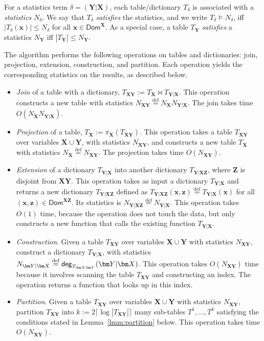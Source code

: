\documentclass[10pt,a4paper]{article}
\newcommand{\dom}{\textsf{Dom}}
\newcommand{\degree}{\text{\sf deg}}
\newcommand{\defeq}{\stackrel{\text{def}}{=}}
\begin{document}
For a statistics term $\delta = (\bm Y | \bm X)$, each table/dictionary $T_\delta$ is
associated with a {\em statistics} $N_\delta$. We say that $T_\delta$ {\em satisfies} the
statistics, and we write $T_\delta \models N_\delta$, iff $|T_\delta(\bm x)| \leq N_\delta$
for all $\bm x \in \dom^{\bm X}$. As a special case, a table $T_{\bm Y}$ {\em satisfies} a
statistics $N_{\bm Y}$ iff $|T_{\bm Y}| \leq N_{\bm Y}$.

The algorithm performs the following operations on tables and dictionaries:
join, projection, extension, construction, and partition.
Each operation yields the corresponding statistics on the results, as described below.

\begin{itemize}
\item {\em Join} of a table with a dictionary,
  $T_{\bm X\bm Y} := T_{\bm X} \Join T_{\bm Y|\bm X}$.  This operation
  constructs a new table with statistics
  $N_{\bm X\bm Y} \defeq N_{\bm X} N_{\bm Y|\bm X}$.  The join takes time $O(N_{\bm X} N_{\bm Y|\bm X})$.
\item {\em Projection} of a table, $T_{\bm X} := \pi_{\bm X}(T_{\bm X\bm Y})$.
This operation takes a table $T_{\bm X \bm Y}$ over variables $\bm X \cup \bm Y$,
with statistics $N_{\bm X\bm Y}$, and constructs a new table $T_{\bm X}$ with
  statistics $N_{\bm X} \defeq N_{\bm X\bm Y}$. The projection takes time
  $O(N_{\bm X\bm Y})$.
\item {\em Extension} of a dictionary $T_{\bm Y|\bm X}$ into another dictionary $T_{\bm
Y|\bm X\bm Z}$, where $\bm Z$ is disjoint from $\bm X\bm Y$. This operation takes as input a
dictionary $T_{\bm Y|\bm X}$ and returns a new dictionary $T_{\bm Y|\bm X\bm Z}$ defined as
$T_{\bm Y|\bm X\bm Z}(\bm x,\bm z) \defeq T_{\bm Y|\bm X}(\bm x)$ for all $
(\bm x,\bm z) \in \dom^{\bm X\bm Z}$.  Its statistics is $N_{\bm Y|\bm X\bm Z} \defeq N_{\bm Y|\bm X}$.
This operation takes $O(1)$ time, because the operation does not touch the data, but
only constructs a new function that calls the existing function $T_{\bm Y|\bm X}$.
\item {\em Construction}.  Given a table $T_{\bm X\bm Y}$
  over variables $\bm X \cup \bm Y$ with statistics $N_{\bm X\bm Y}$, construct a dictionary
  $T_{\bm Y|\bm X}$, with statistics
  $N_{\bm Y|\bm X} \defeq \degree_{T_{\bm X\bm Y}}(\bm Y|\bm X)$.
  This operation takes $O(N_{\bm X\bm Y})$ time because it involves
  scanning the table $T_{\bm X\bm Y}$ and constructing an index.
  The operation returns a function that looks up in this index.
\item {\em Partition}. Given a table $T_{\bm X\bm Y}$
over variables $\bm X \cup \bm Y$ with statistics $N_{\bm X\bm Y}$,
partition $T_{\bm X\bm Y}$ into $k:=2\lceil \log |T_{\bm X\bm Y}| \rceil$ many sub-tables
$T^{1},\dots,T^{k}$ satisfying the conditions stated in Lemma~\ref{lmm:partition}
below. This operation takes time $O(N_{\bm X\bm Y})$.
\end{itemize}
\end{document}
